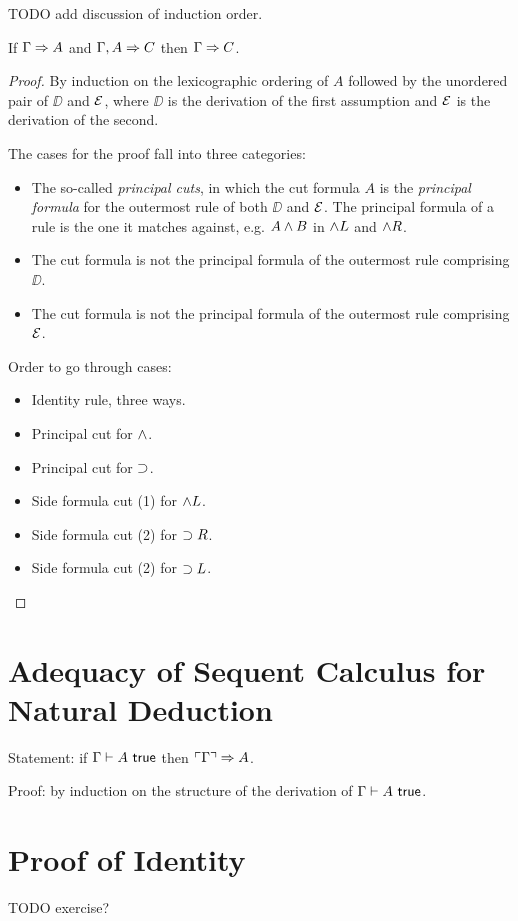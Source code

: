 \documentclass{article}
\begin{document}
TODO add discussion of induction order.

\begin{theorem}[Cut]
  If $\Gamma \Rightarrow A$ and $\Gamma, A \Rightarrow C$ then $\Gamma \Rightarrow C$.
\end{theorem}

\begin{proof}
  By induction on the lexicographic ordering of $A$ followed
  by the unordered pair of $\DD$ and $\mathcal{E}$, where $\DD$ is the derivation
  of the first assumption and $\mathcal{E}$ is the derivation of the second.

  The cases for the proof fall into three categories:
  \begin{itemize}
    \item The so-called {\em principal cuts}, in which the cut formula 
      $A$ is the {\em principal formula} for the outermost rule of both 
      $\DD$ and $\mathcal{E}$. 
      The principal formula of a rule is the one it matches against,
      e.g. $A \wedge B$ in $\wedge L$ and $\wedge R$.
    \item The cut formula is not the principal formula of the outermost
      rule comprising $\DD$.
    \item The cut formula is not the principal formula of the outermost
      rule comprising $\mathcal{E}$.
  \end{itemize}

  Order to go through cases:
  \begin{itemize}
    \item Identity rule, three ways.
    \item Principal cut for $\wedge$.
    \item Principal cut for $\supset$.
    \item Side formula cut (1) for $\wedge L$.
    \item Side formula cut (2) for $\supset R$.
    \item Side formula cut (2) for $\supset L$.
  \end{itemize}
\end{proof}

\section{Adequacy of Sequent Calculus for Natural Deduction}

Statement: if $\Gamma \vdash A\ \mathsf{true}$ then $\ulcorner \Gamma \urcorner
\Rightarrow A$.

Proof: by induction on the structure of the derivation of $\Gamma \vdash A
\ \mathsf{true}$.

\section{Proof of Identity}

TODO exercise?




\end{document}
